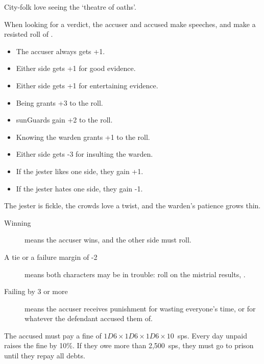 \begin{multicols}{2}
City-folk love seeing the `theatre of oaths'.

When looking for a verdict, the accuser and accused make speeches, and make a resisted roll of .

\begin{itemize}
  \item
  The accuser always gets +1.
  \item
  Either side gets +1 for good evidence.
  \item
  Either side gets +1 for entertaining evidence.
  \item
  Being  grants +3 to the roll.
  \item
  \Glspl{sunGuard} gain +2 to the roll.
  \item
  Knowing the \gls{warden} grants +1 to the roll.
  \item
  Either side gets -3 for insulting the \gls{warden}.
  \item
  If the jester likes one side, they gain +1.
  \item
  If the jester hates one side, they gain -1.
\end{itemize}

The jester is fickle, the crowds love a twist, and the \gls{warden}'s patience grows thin.

\begin{description}
  \item[Winning]
  means the accuser wins, and the other side must roll.
  \item[A tie or a failure margin of -2]
  means both characters may be in trouble: roll on the mistrial results, .
  \item[Failing by 3 or more]
  means the accuser receives punishment for wasting everyone's time, or for whatever the defendant accused them of.
\end{description}

\begin{dlist}
  \item
  \ifodd\value{temperature}
    The accused must pay a fine of $1D6\times 1D6\times 1D6\times 10$~\glspl{sp}.
    Every day unpaid raises the fine by 10\%.
    If they owe more than 2,500~\glspl{sp}, they must go to prison until they repay all debts.


\end{dlist}
\end{multicols}
